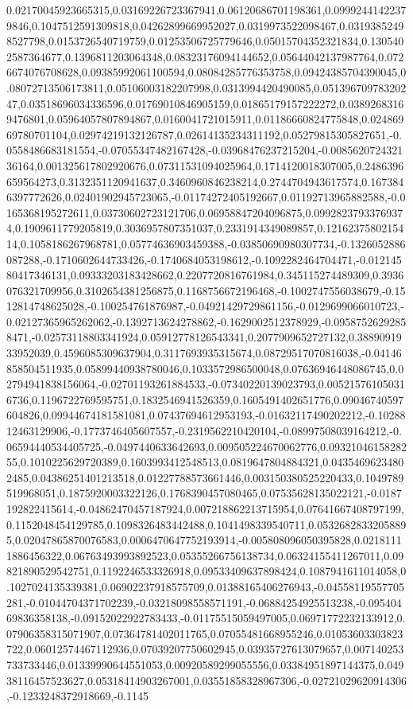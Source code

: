 0.02170045923665315,0.03169226723367941,0.06120686701198361,0.09992441422379846,0.1047512591309818,0.04262899669952027,0.0319973522098467,0.03193852498527798,0.0153726540719759,0.01253506725779646,0.05015704352321834,0.1305402587364677,0.1396811203064348,0.08323176094144652,0.05644042137987764,0.0726674076708628,0.09385992061100594,0.08084285776353758,0.09424385704390045,0.08072713506173811,0.05106003182207998,0.0313994420490085,0.05139670978320247,0.03518696034336596,0.01769010846905159,0.01865179157222272,0.03892683169476801,0.05964057807894867,0.0160041721015911,0.01186660824775848,0.02486969780701104,0.02974219132126787,0.02614135234311192,0.05279815305827651,-0.0558486683181554,-0.07055347482167428,-0.03968476237215204,-0.008562072432136164,0.001325617802920676,0.07311531094025964,0.1714120018307005,0.2486396659564273,0.3132351120941637,0.3460960846238214,0.2744704943617574,0.1673846397772626,0.02401902945723065,-0.01174272405192667,0.01192713965882588,-0.0165368195272611,0.03730602723121706,0.06958847204096875,0.09928237933769374,0.1909611779205819,0.3036957807351037,0.2331914349089857,0.1216237580215414,0.1058186267968781,0.05774636903459388,-0.03850690980307734,-0.1326052886087288,-0.1710602644733426,-0.1740684053198612,-0.1092282464704471,-0.01214580417346131,0.09333203183428662,0.2207720816761984,0.345115274489309,0.3936076321709956,0.3102654381256875,0.1168756672196468,-0.1002747556038679,-0.1512814748625028,-0.100254761876987,-0.04921429729861156,-0.0129699066010723,-0.02127365965262062,-0.1392713624278862,-0.1629002512378929,-0.09587526292858471,-0.02573118803341924,0.05912778126543341,0.2077909652727132,0.3889091933952039,0.4596085309637904,0.3117693935315674,0.08729517070816038,-0.04146858504511935,0.05899440938780046,0.1033572986500048,0.07636946448086745,0.02794941838156064,-0.02701193261884533,-0.07340220139023793,0.005215761050316736,0.1196722769595751,0.1832546941526359,0.1605491402651776,0.09046740597604826,0.09944674181581081,0.07437694612953193,-0.01632117490202212,-0.1028812463129906,-0.1773746405607557,-0.2319562210420104,-0.08997508039164212,-0.06594440534405725,-0.0497440633642693,0.009505224670062776,0.0932104615828255,0.1010225629720389,0.1603993412548513,0.0819647804884321,0.04354696234802485,0.04386251401213518,0.01227788573661446,0.003150380525220433,0.1049789519968051,0.1875920003322126,0.1768390457080465,0.07535628135022121,-0.0187192822415614,-0.04862470457187924,0.007218862213715954,0.07641667408797199,0.1152048454129785,0.1098326483442488,0.1041498339540711,0.05326828332058895,0.02047865870076583,0.0006470647752193914,-0.005808096050395828,0.02181111886456322,0.06763493993892523,0.05355266756138734,0.06324155411267011,0.09821890529542751,0.1192246533326918,0.09533409637898424,0.1087941611014058,0.1027024135339381,0.06902237918575709,0.01388165406276943,-0.04558119557705281,-0.01044704371702239,-0.03218098558571191,-0.06884254925513238,-0.09540469836358138,-0.09152022922783433,-0.01175515059497005,0.06971772232133912,0.07906358315071907,0.07364781402011765,0.07055481668955246,0.01053603303823722,0.06012574467112936,0.07039207750602945,0.03935727613079657,0.007140253733733446,0.01339990644551053,0.00920589299055556,0.03384951897144375,0.04938116457523627,0.05318414903267001,0.03551858328967306,-0.02721029620914306,-0.1233248372918669,-0.1145